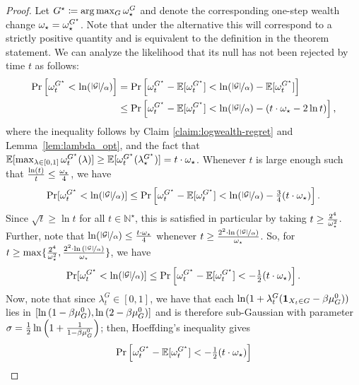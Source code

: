 \begin{proof}
Let ${G^\star} \coloneqq \arg\max_G \omega_\star^G$ and denote the corresponding one-step wealth change $\omega_\star = \omega_\star^{G^\star}$. Note that under the alternative this will correspond to a strictly positive quantity and is equivalent to the definition in the theorem statement. We can analyze the likelihood that its null has not been rejected by time $t$ as follows:
\begin{align*}
\Pr\left[\omega_t^{{G^\star}} < \ln({\nicefrac{|{\mathcal{G}}|}{\alpha}})\right] 
&=  \Pr\left[\omega_t^{{G^\star}} - \mathbb{E}[\omega_t^{{G^\star}}]< \ln({\nicefrac{|{\mathcal{G}}|}{\alpha}}) - \mathbb{E}[\omega_t^{{G^\star}}]\right] \\ 
 &\leq \Pr\left[\omega_t^{{G^\star}} - \mathbb{E}[\omega_t^{{G^\star}}]< \ln({\nicefrac{|{\mathcal{G}}|}{\alpha}}) - (t\cdot \omega_\star - 2\ln t)\right], 
 \end{align*}
 where the inequality follows by Claim \ref{claim:logwealth-regret} and Lemma~\ref{lem:lambda_opt}, and the fact that $\mathbb{E}[\max_{\lambda\in[0, 1]} \omega_t^{G^\star}(\lambda)] \geq \mathbb{E}[\omega_t^{G^\star}(\lambda_\star^{G^\star})] = t \cdot \omega_\star$. Whenever $t$ is large enough such that $\frac{\ln(t)}{t} \leq \frac{\omega_\star}{4}$, we have 
\begin{align}
\label{eq:prnostop}
    \Pr[\omega_t^{G^\star} < \ln({\nicefrac{|{\mathcal{G}}|}{\alpha}})] \leq \Pr\left[\omega_t^{{G^\star}} - \mathbb{E}[\omega_t^{{G^\star}}]< \ln({\nicefrac{|{\mathcal{G}}|}{\alpha}}) - \tfrac{3}{4}(t\cdot \omega_\star)\right].
\end{align}
Since $\sqrt{t} \geq \ln{t}$ for all $t\in \mathbb{N}^\star$, this is satisfied in particular by taking $t\geq \frac{2^4}{\omega_\star^2}$. Further, note that $\ln({\nicefrac{|{\mathcal{G}}|}{\alpha}}) \leq \frac{t\cdot \omega_\star}{4}$ whenever $t\geq \frac{2^2\cdot \ln{({\nicefrac{|{\mathcal{G}}|}{\alpha}})}}{\omega_\star}$. So, for $t\geq \max\{\frac{2^4}{\omega_\star^2}, \frac{2^2\cdot \ln{({\nicefrac{|{\mathcal{G}}|}{\alpha}})}}{\omega_\star}\}$, we have
\[\Pr[\omega_t^{G^\star} < \ln({\nicefrac{|{\mathcal{G}}|}{\alpha}})] \leq \Pr\left[\omega_t^{{G^\star}} - \mathbb{E}[\omega_t^{{G^\star}}]< - \tfrac{1}{2}(t\cdot \omega_\star)\right].\]
Now, note that since $\lambda_t^G \in [0,1]$, we have that each $\ln(1 + \lambda_t^G(\mathbf{1}_{X_t \in G} - \beta{\mu_G^0}))$ lies in $[\ln{(1-\beta{\mu_G^0})}, \ln{(2 - \beta{\mu_G^0})}]$ and is therefore sub-Gaussian with parameter $\sigma = \frac{1}{2}\ln{\left(1+ \frac{1}{1-\beta{\mu_G^0}}\right)}$; then, Hoeffding's inequality gives 
\begin{align*}
\Pr\left[\Logwealth_t^{\Gstar} - \E[\Logwealth_t^{\Gstar}]< - \tfrac{1}{2}(t\cdot \Logwealth_\star)\right]

\end{align*}
\end{proof}
